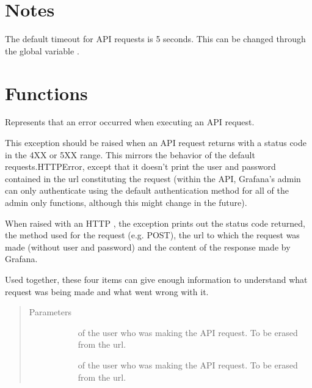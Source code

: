 \documentclass[letterpaper,10pt,english]{sphinxmanual}
\begin{document}
\section{Notes}
\label{\detokenize{grafanaAPI:notes}}
The default timeout for API requests is 5 seconds. This can be changed through
the global variable .


\section{Functions}
\label{\detokenize{grafanaAPI:functions}}

\begin{fulllineitems}
\label{\detokenize{grafanaAPI:grafanaAPI.APIError}}
Represents that an error occurred when executing an API request.

This exception should be raised when an API request returns with a status code
in the 4XX or 5XX range. This mirrors the behavior of the default
requests.HTTPError, except that it doesn’t print the user and password
contained in the url constituting the request (within the API, Grafana’s admin
can only authenticate using the default authentication method for all of the
admin only functions, although this might change in the future).

When raised with an HTTP , the exception prints out the status code
returned, the method used for the request (e.g. POST), the url to which the
request was made (without user and password) and the content of the response
made by Grafana.

Used together, these four items can give enough information to understand what
request was being made and what went wrong with it.
\begin{quote}\begin{description}
\item[{Parameters}] \leavevmode\begin{description}
\item[{}] \leavevmode{[}\sphinxtitleref{str}{]}
 of the user who was making the API request. To be erased from the
url.

\item[{}] \leavevmode{[}\sphinxtitleref{str}{]}
 of the user who was making the API request. To be erased from
the url.


\end{description}
\end{description}
\end{quote}
\end{fulllineitems}
\end{document}
